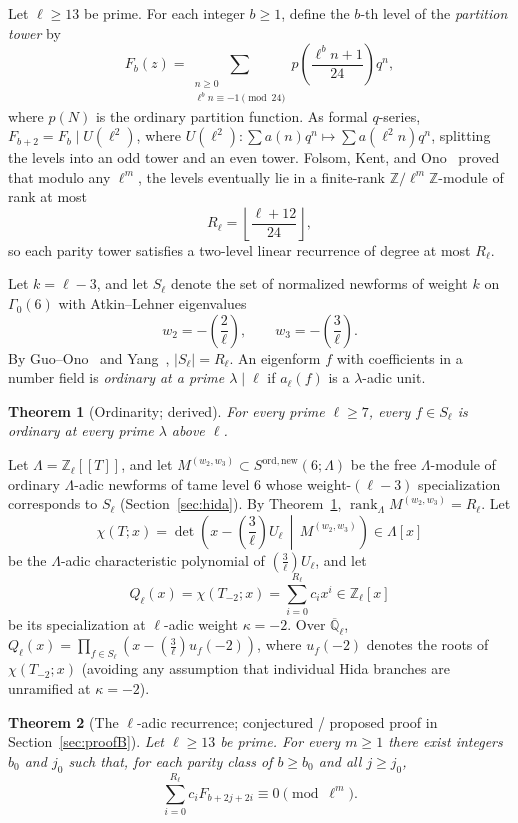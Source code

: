\documentclass[11pt,reqno]{amsart}
\newtheorem{theorem}{Theorem}
\theoremstyle{definition}
\theoremstyle{remark}
\newcommand{\Z}{\mathbb{Z}}
\newcommand{\Q}{\mathbb{Q}}
\newcommand{\legendre}[2]{\left(\frac{#1}{#2}\right)}
\newcommand{\ord}{\mathrm{ord}}
\newcommand{\new}{\mathrm{new}}
\begin{document}
Let $\ell \ge 13$ be prime. For each integer $b \ge 1$, define the $b$-th level of the \emph{partition tower} by
\[
  F_b(z) = \sum_{\substack{n \ge 0 \\ \ell^b n \equiv -1 \pmod{24}}} p\!\left(\frac{\ell^b n + 1}{24}\right) q^n,
\]
where $p(N)$ is the ordinary partition function. As formal $q$-series, $F_{b+2} = F_b \mid U(\ell^2)$, where $U(\ell^2)\colon \sum a(n)q^n \mapsto \sum a(\ell^2 n)q^n$, splitting the levels into an odd tower and an even tower. Folsom, Kent, and Ono~\cite{FKO} proved that modulo any $\ell^m$, the levels eventually lie in a finite-rank $\Z/\ell^m\Z$-module of rank at most
\[
  R_\ell = \left\lfloor \frac{\ell + 12}{24} \right\rfloor,
\]
so each parity tower satisfies a two-level linear recurrence of degree at most $R_\ell$.

Let $k = \ell - 3$, and let $S_\ell$ denote the set of normalized newforms of weight $k$ on $\Gamma_0(6)$ with Atkin--Lehner eigenvalues
\[
  w_2 = -\legendre{2}{\ell}, \qquad w_3 = -\legendre{3}{\ell}.
\]
By Guo--Ono~\cite{GO} and Yang~\cite{Y11}, $|S_\ell| = R_\ell$. An eigenform $f$ with coefficients in a number field is \emph{ordinary at a prime $\lambda \mid \ell$} if $a_\ell(f)$ is a $\lambda$-adic unit.

\begin{theorem}[Ordinarity; derived]\label{thm:ord}
For every prime $\ell \ge 7$, every $f \in S_\ell$ is ordinary at every prime $\lambda$ above $\ell$.
\end{theorem}

Let $\Lambda = \Z_\ell[[T]]$, and let $M^{(w_2,w_3)} \subset S^{\ord,\new}(6;\Lambda)$ be the free $\Lambda$-module of ordinary $\Lambda$-adic newforms of tame level $6$ whose weight-$(\ell-3)$ specialization corresponds to $S_\ell$ (Section~\ref{sec:hida}). By Theorem~\ref{thm:ord}, $\operatorname{rank}_\Lambda M^{(w_2,w_3)} = R_\ell$. Let
\[
  \chi(T; x) = \det\!\left(x - \legendre{3}{\ell} U_\ell \,\middle|\, M^{(w_2,w_3)}\right) \in \Lambda[x]
\]
be the $\Lambda$-adic characteristic polynomial of $\legendre{3}{\ell} U_\ell$, and let
\[
  Q_\ell(x) = \chi(T_{-2}; x) = \sum_{i=0}^{R_\ell} c_i x^i \in \Z_\ell[x]
\]
be its specialization at $\ell$-adic weight $\kappa = -2$. Over $\overline{\Q}_\ell$, $Q_\ell(x) = \prod_{f \in S_\ell} (x - \legendre{3}{\ell} u_f(-2))$, where $u_f(-2)$ denotes the roots of $\chi(T_{-2};x)$ (avoiding any assumption that individual Hida branches are unramified at $\kappa = -2$).

\begin{theorem}[The $\ell$-adic recurrence; conjectured / proposed proof in Section~\ref{sec:proofB}]\label{thm:main}
Let $\ell \ge 13$ be prime. For every $m \ge 1$ there exist integers $b_0$ and $j_0$ such that, for each parity class of $b \ge b_0$ and all $j \ge j_0$,
\[
  \sum_{i=0}^{R_\ell} c_i F_{b+2j+2i} \equiv 0 \pmod{\ell^m}.
\]
\end{theorem}
\end{document}
